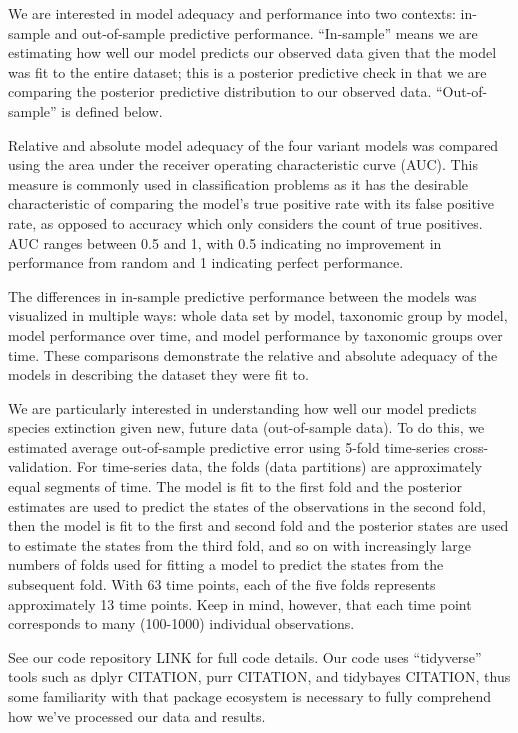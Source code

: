 \documentclass[12pt,letterpaper]{article}
\begin{document}
We are interested in model adequacy and performance into two contexts: in-sample and out-of-sample predictive performance. ``In-sample'' means we are estimating how well our model predicts our observed data given that the model was fit to the entire dataset; this is a posterior predictive check in that we are comparing the posterior predictive distribution to our observed data. ``Out-of-sample'' is defined below.

Relative and absolute model adequacy of the four variant models was compared using the area under the receiver operating characteristic curve (AUC). This measure is commonly used in classification problems as it has the desirable characteristic of comparing the model's true positive rate with its false positive rate, as opposed to accuracy which only considers the count of true positives. AUC ranges between 0.5 and 1, with 0.5 indicating no improvement in performance from random and 1 indicating perfect performance. 

The differences in in-sample predictive performance between the models was visualized in multiple ways: whole data set by model, taxonomic group by model, model performance over time, and model performance by taxonomic groups over time. These comparisons demonstrate the relative and absolute adequacy of the models in describing the dataset they were fit to.

We are particularly interested in understanding how well our model predicts species extinction given new, future data (out-of-sample data). To do this, we estimated average out-of-sample predictive error using 5-fold time-series cross-validation. For time-series data, the folds (data partitions) are approximately equal segments of time. The model is fit to the first fold and the posterior estimates are used to predict the states of the observations in the second fold, then the model is fit to the first and second fold and the posterior states are used to estimate the states from the third fold, and so on with increasingly large numbers of folds used for fitting a model to predict the states from the subsequent fold. With 63 time points, each of the five folds represents approximately 13 time points. Keep in mind, however, that each time point corresponds to many (100-1000) individual observations.


See our code repository LINK for full code details. Our code uses ``tidyverse'' tools such as dplyr CITATION, purr CITATION, and tidybayes CITATION, thus some familiarity with that package ecosystem is necessary to fully comprehend how we've processed our data and results.
\end{document}
